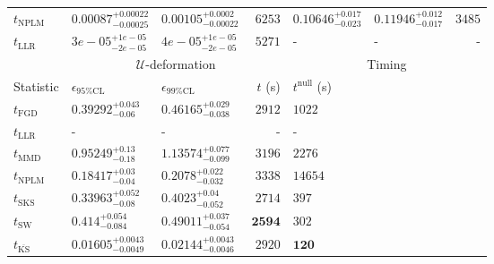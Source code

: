 \begin{tabular}{l|llr|llr}
\rowcolor{red!35}	$t_{\mathrm{NPLM}}$ & $0.00087_{-0.00025}^{+0.00022}$ & $0.00105_{-0.00022}^{+0.0002}$ & $6253$ & $0.10646_{-0.023}^{+0.017}$ & $0.11946_{-0.017}^{+0.012}$ & $3485$ \\
	$t_{\mathrm{LLR}}$ & $3e-05_{-2e-05}^{+1e-05}$ & $4e-05_{-2e-05}^{+1e-05}$ & $5271$ & - & - & - \\
	\toprule
	\multicolumn{1}{c}{} & \multicolumn{3}{c}{$\mathcal{U}$-deformation} & \multicolumn{3}{c}{Timing} \\
	Statistic & $\epsilon_{95\%\mathrm{CL}}$ & $\epsilon_{99\%\mathrm{CL}}$ & $t$ (s) & $t^{\mathrm{null}}$ (s) \\
	\midrule
	$t_{\mathrm{FGD}}$ & $0.39292_{-0.06}^{+0.043}$ & $0.46165_{-0.038}^{+0.029}$ & $2912$ & $1022$ \\
	$t_{\mathrm{LLR}}$ & - & - & - & - \\
	$t_{\mathrm{MMD}}$ & $0.95249_{-0.18}^{+0.13}$ & $1.13574_{-0.099}^{+0.077}$ & $3196$ & $2276$ \\
\rowcolor{red!35}	$t_{\mathrm{NPLM}}$ & $0.18417_{-0.04}^{+0.03}$ & $0.2078_{-0.032}^{+0.022}$ & $3338$ & $14654$ \\
	$t_{\mathrm{SKS}}$ & $0.33963_{-0.08}^{+0.052}$ & $0.4023_{-0.052}^{+0.04}$ & $2714$ & $397$ \\
	$t_{\mathrm{SW}}$ & $0.414_{-0.084}^{+0.054}$ & $0.49011_{-0.054}^{+0.037}$ & ${\mathbf{2594}}$ & $302$ \\
	$t_{\overline{\mathrm{KS}}}$ & ${\mathbf{0.01605_{-0.0049}^{+0.0043}}}$ & ${\mathbf{0.02144_{-0.0046}^{+0.0043}}}$ & $2920$ & ${\mathbf{120}}$ \\
	\bottomrule
\end{tabular}